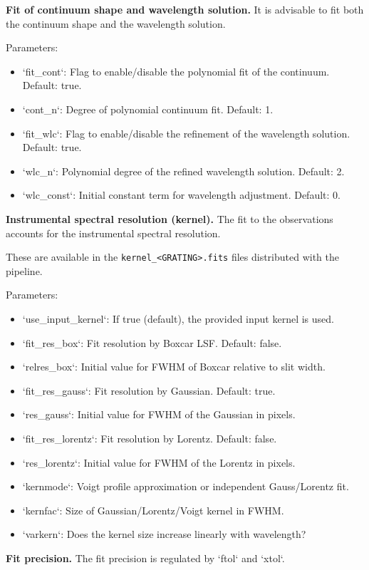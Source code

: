 \textbf{Fit of continuum shape and wavelength solution.} It is advisable to fit both the continuum
shape and the wavelength solution.

Parameters:
\begin{itemize}
\item `fit\_cont`: Flag to enable/disable the polynomial fit of the continuum. Default: true.
\item `cont\_n`: Degree of polynomial continuum fit. Default: 1.
\item `fit\_wlc`: Flag to enable/disable the refinement of the wavelength solution. Default: true.
\item `wlc\_n`: Polynomial degree of the refined wavelength solution. Default: 2.
\item `wlc\_const`: Initial constant term for wavelength adjustment. Default: 0.
\end{itemize}

\textbf{Instrumental spectral resolution (kernel).} The fit to the observations accounts for the instrumental
spectral resolution.

These are available in the {\tt kernel\_<GRATING>.fits}
files distributed with the pipeline.

Parameters:
\begin{itemize}
\item `use\_input\_kernel`: If true (default), the provided input kernel is used.
\item `fit\_res\_box`: Fit resolution by Boxcar LSF. Default: false.
\item `relres\_box`: Initial value for FWHM of Boxcar relative to slit width.
\item `fit\_res\_gauss`: Fit resolution by Gaussian. Default: true.
\item `res\_gauss`: Initial value for FWHM of the Gaussian in pixels.
\item `fit\_res\_lorentz`: Fit resolution by Lorentz. Default: false.
\item `res\_lorentz`: Initial value for FWHM of the Lorentz in pixels.
\item `kernmode`: Voigt profile approximation or independent Gauss/Lorentz fit.
\item `kernfac`: Size of Gaussian/Lorentz/Voigt kernel in FWHM.
\item `varkern`: Does the kernel size increase linearly with wavelength?
\end{itemize}

\textbf{Fit precision.} The fit precision is regulated by `ftol` and `xtol`.

